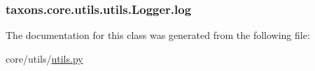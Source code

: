 \subsubsection[{\texorpdfstring{log}{log}}]{\setlength{\rightskip}{0pt plus 5cm}taxons.\+core.\+utils.\+utils.\+Logger.\+log}\hypertarget{classtaxons_1_1core_1_1utils_1_1utils_1_1_logger_a961d2f3718cdde387d9d6233fa49cbe3}{}\label{classtaxons_1_1core_1_1utils_1_1utils_1_1_logger_a961d2f3718cdde387d9d6233fa49cbe3}


The documentation for this class was generated from the following file\+:\begin{DoxyCompactItemize}
\item 
core/utils/\hyperlink{core_2utils_2utils_8py}{utils.\+py}\end{DoxyCompactItemize}
